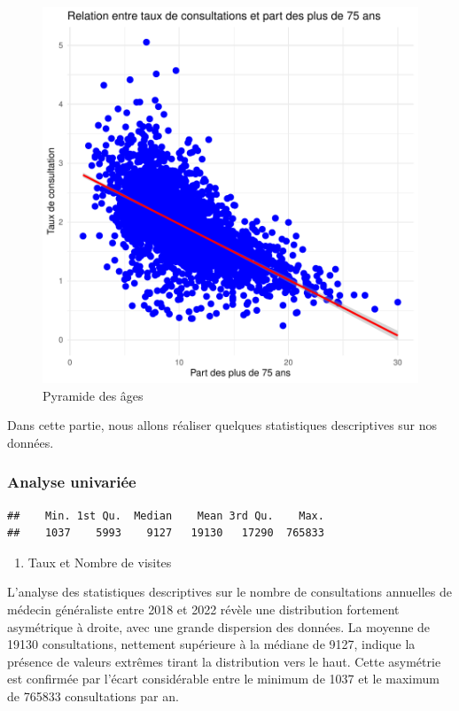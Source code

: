 \documentclass[
]{article}
\providecommand{\tightlist}{%
  \setlength{\itemsep}{0pt}\setlength{\parskip}{0pt}}
\begin{document}
\begin{figure}

{\centering \includegraphics{Rapport_Projet_Stat_Ensai_files/figure-latex/unnamed-chunk-3-1} 

}

\caption{Pyramide des âges}\label{fig:unnamed-chunk-3}
\end{figure}

Dans cette partie, nous allons réaliser quelques statistiques
descriptives sur nos données.

\subsubsection{Analyse univariée}\label{analyse-univariuxe9e}

\begin{verbatim}
##    Min. 1st Qu.  Median    Mean 3rd Qu.    Max. 
##    1037    5993    9127   19130   17290  765833
\end{verbatim}

\begin{enumerate}
\def\labelenumi{\arabic{enumi}.}
\tightlist
\item
  Taux et Nombre de visites
\end{enumerate}

L'analyse des statistiques descriptives sur le nombre de consultations
annuelles de médecin généraliste entre 2018 et 2022 révèle une
distribution fortement asymétrique à droite, avec une grande dispersion
des données. La moyenne de 19130 consultations, nettement supérieure à
la médiane de 9127, indique la présence de valeurs extrêmes tirant la
distribution vers le haut. Cette asymétrie est confirmée par l'écart
considérable entre le minimum de 1037 et le maximum de 765833
consultations par an.
\end{document}
